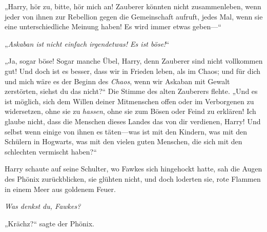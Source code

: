 „Harry, hör zu, bitte, hör mich an! Zauberer könnten nicht zusammenleben, wenn jeder von ihnen zur Rebellion gegen die Gemeinschaft aufruft, jedes Mal, wenn sie eine unterschiedliche Meinung haben! Es wird immer etwas geben—“

„\emph{Askaban ist nicht einfach irgendetwas! Es ist böse!}“

„Ja, sogar böse! Sogar manche Übel, Harry, denn Zauberer sind nicht vollkommen gut! Und doch ist es besser, dass wir in Frieden leben, als im Chaos; und für dich und mich wäre es der Beginn des \emph{Chaos}, wenn wir Askaban mit Gewalt zerstörten, siehst du das nicht?“ Die Stimme des alten Zauberers flehte. „Und es ist möglich, sich dem Willen deiner Mitmenschen offen oder im Verborgenen zu widersetzen, ohne sie zu \emph{hassen}, ohne sie zum Bösen oder Feind zu erklären! Ich glaube nicht, dass die Menschen dieses Landes das von dir verdienen, Harry! Und selbst wenn einige von ihnen es täten—was ist mit den Kindern, was mit den Schülern in Hogwarts, was mit den vielen guten Menschen, die sich mit den schlechten vermischt haben?“

Harry schaute auf seine Schulter, wo Fawkes sich hingehockt hatte, sah die Augen des Phönix zurückblicken, sie glühten nicht, und doch loderten sie, rote Flammen in einem Meer aus goldenem Feuer.

\emph{Was denkst du, Fawkes?}

„Krächz?“ sagte der Phönix.

